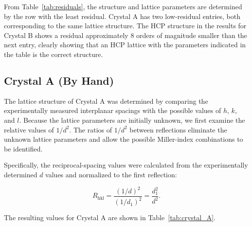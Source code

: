 \documentclass[12pt]{article}
\begin{document}
From Table~\ref{tab:residuals}, the structure and lattice parameters are determined by the row with the least residual. 
Crystal A has two low-residual entries, both corresponding to the same lattice structure. 
The HCP structure in the results for Crystal B shows a residual approximately 8 orders of magnitude smaller than the next entry, 
clearly showing that an HCP lattice with the parameters indicated in the table is the correct structure. 

\subsection{Crystal A (By Hand)}
The lattice structure of Crystal A was determined by comparing the experimentally measured interplanar spacings with the possible values of $h$, $k$, and $l$. Because the lattice parameters are initially unknown, we first examine the relative values of $1/d^2$. The ratios of $1/d^2$ between reflections eliminate the unknown lattice parameters and allow the possible Miller-index combinations to be identified.

Specifically, the reciprocal-spacing values were calculated from the experimentally determined $d$ values and normalized to the first reflection:

\begin{equation}
R_{\mathrm{hkl}}
=
\frac{(1/d)^2}{(1/d_1)^2}
=
\frac{d_1^2}{d^2}.
\end{equation}

The resulting values for Crystal A are shown in Table~\ref{tab:crystal_A}.
\end{document}
